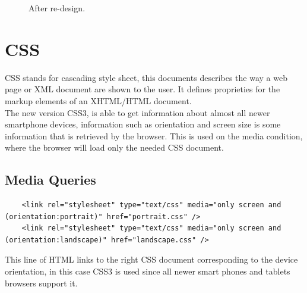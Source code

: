 \begin{figure}[h!]
	\center
		\setlength\fboxsep{0pt}
		\setlength\fboxrule{1pt}
   	\caption{After re-design.}
\end{figure}

\section{CSS}  %

CSS stands for cascading style sheet, this documents describes the way a web page or XML document are shown to the user. It defines proprieties for the markup elements of an XHTML/HTML document.
\\
The new version CSS3, is able to get information about almost all newer smartphone devices, information such as orientation and screen size is some information that is retrieved by the browser. This is used on the media condition, where the browser will load only the needed CSS document.

\subsection{Media Queries}

\begin{lstlisting}
	<link rel="stylesheet" type="text/css" media="only screen and (orientation:portrait)" href="portrait.css" />
	<link rel="stylesheet" type="text/css" media="only screen and (orientation:landscape)" href="landscape.css" />
\end{lstlisting}

This line of HTML links to the right CSS document corresponding to the device orientation, in this case CSS3 is used since all newer smart phones and tablets browsers support it.

